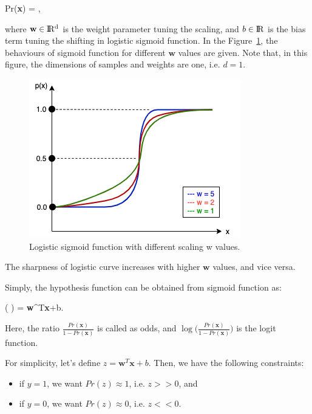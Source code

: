 \be
\label{eq:logistic_p}
Pr(\textbf{x}) = \:,
\ee

where $\textbf{w} \in \rm I\!R^{d}$ is the weight parameter tuning the scaling, and $b \in \rm I\!R$ is the bias term tuning the shifting in logistic sigmoid function. In the Figure~\ref{logistic_function}, the behaviours of sigmoid function for different $\textbf{w}$ values are given. Note that, in this figure, the dimensions of samples and weights are one, i.e. $d = 1$.

\begin{figure}[h]
	\centering
	\includegraphics[width=.6\linewidth]{fig/logistic_function.png}
	\vspace*{2mm}
	\caption{Logistic sigmoid function with different scaling w values. }
	\label{logistic_function}
\end{figure}

The sharpness of logistic curve increases with higher $\textbf{w}$ values, and vice versa.

Simply, the hypothesis function can be obtained from sigmoid function as:

\be
\label{eq:logistic_hyptothesis}
\ln \Big ( \Big ) = \textbf{w}^{T}\textbf{x}+b\:.
\ee

Here, the ratio $\frac{Pr(\textbf{x})}{1 - Pr(\textbf{x})}$ is called as odds, and $\log \Big (\frac{Pr(\textbf{x})}{1 - Pr(\textbf{x})} \Big )$ is the logit function.

For simplicity, let's define $z = \textbf{w}^{T}\textbf{x}+b$. Then, we have the following constraints:

\begin{itemize}
	\item if $y = 1$, we want $Pr(z) \approx 1$, i.e. $z >> 0$, and
	\item if $y = 0$, we want $Pr(z) \approx 0$, i.e. $z << 0$.
\end{itemize}

